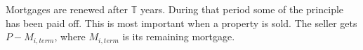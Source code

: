 {Mortgages are renewed after $\mathbb{T}$ years. During that period some of the principle has been paid off. This is most important when a property is sold. The seller gets $P-M_{i,term}$, where  $M_{i,term}$ is its remaining mortgage.



















}
